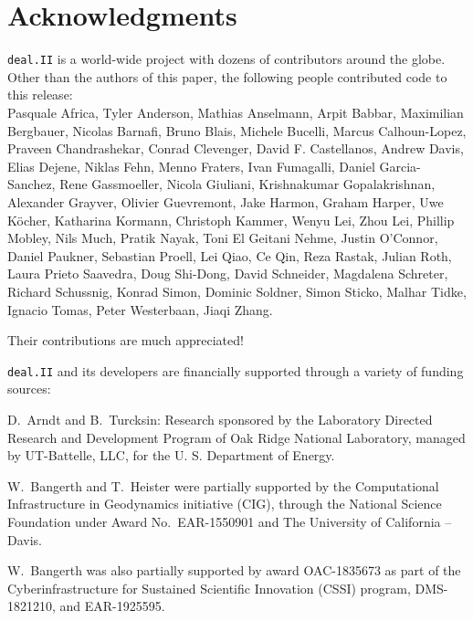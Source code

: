 \documentclass{ansarticle-preprint}
\newcommand{\specialword}[1]{\texttt{#1}}
\newcommand{\dealii}{{\specialword{deal.II}}\xspace}
\begin{document}
\section{Acknowledgments}

\dealii{} is a world-wide project with dozens of contributors around the
globe. Other than the authors of this paper, the following people
contributed code to this release:\\
%
%
Pasquale Africa,
Tyler Anderson,
Mathias Anselmann,
Arpit Babbar,
Maximilian Bergbauer,
Nicolas Barnafi,
Bruno Blais,
Michele Bucelli,
Marcus Calhoun-Lopez,
Praveen Chandrashekar,
Conrad Clevenger,
David F. Castellanos,
Andrew Davis,
Elias Dejene,
Niklas Fehn,
Menno Fraters,
Ivan Fumagalli,
Daniel Garcia-Sanchez,
Rene Gassmoeller,
Nicola Giuliani,
Krishnakumar Gopalakrishnan,
Alexander Grayver,
Olivier Guevremont,
Jake Harmon,
Graham Harper,
Uwe K\"ocher,
Katharina Kormann,
Christoph Kammer,
Wenyu Lei,
Zhou Lei,
Phillip Mobley,
Nils Much,
Pratik Nayak,
Toni El Geitani Nehme,
Justin O'Connor,
Daniel Paukner,
Sebastian Proell,
Lei Qiao,
Ce Qin,
Reza Rastak,
Julian Roth,
Laura Prieto Saavedra,
Doug Shi-Dong,
David Schneider,
Magdalena Schreter,
Richard Schussnig,
Konrad Simon,
Dominic Soldner,
Simon Sticko,
Malhar Tidke,
Ignacio Tomas,
Peter Westerbaan,
Jiaqi Zhang.


Their contributions are much appreciated!


\bigskip

\dealii{} and its developers are financially supported through a
variety of funding sources:

D.~Arndt and B.~Turcksin: Research sponsored by the Laboratory Directed Research and
Development Program of Oak Ridge National Laboratory, managed by UT-Battelle,
LLC, for the U. S. Department of Energy.

W.~Bangerth and T.~Heister were partially
supported by the Computational Infrastructure
in Geodynamics initiative (CIG), through the National Science
Foundation under Award No.~EAR-1550901 and The
University of California -- Davis.


W.~Bangerth was also partially supported by award OAC-1835673 as part of the Cyberinfrastructure for Sustained Scientific Innovation (CSSI)
program, DMS-1821210,
and EAR-1925595.
\end{document}
